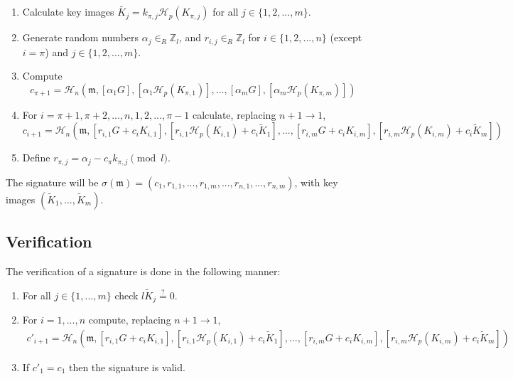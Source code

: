 \begin{enumerate}
	
	\item Calculate key images \(\tilde{K_j} = k_{\pi, j} \mathcal{H}_p(K_{\pi, j})\) for all \(j \in \{1, 2, ..., m\}\).
	
	\item Generate random numbers  \(\alpha_j \in_R \mathbb{Z}_l\), and \(r_{i, j} \in_R \mathbb{Z}_l\) for \(i \in \{1, 2, ..., n\}\) (except \(i = \pi\)) and \(j \in \{1, 2, ..., m\}\).
	
	\item Compute 
	\[
	c_{\pi+1} = \mathcal{H}_n(\mathfrak{m}, [\alpha_1 G], [\alpha_1 \mathcal{H}_p(K_{\pi, 1})], ..., [\alpha_m G], [\alpha_m \mathcal{H}_p(K_{\pi, m})])
	\]
	
	\item For \(i = \pi+1, \pi+2, ..., n, 1, 2, ..., \pi-1\) calculate, replacing \(n + 1 \rightarrow 1\),\vspace{.2cm}
	\[  c_{i+1} = \mathcal{H}_n(\mathfrak{m}, [r_{i, 1} G + c_i K_{i, 1}], [r_{i, 1} \mathcal{H}_p(K_{i, 1}) + c_i \tilde{K}_1], 
	..., [r_{i, m} G + c_i K_{i, m}], [r_{i, m} \mathcal{H}_p(K_{i, m}) + c_i \tilde{K}_m])  \] 
	
	
	\item Define \(r_{\pi, j} = \alpha_j - c_\pi k_{\pi, j} \pmod l\).
	
\end{enumerate}

The signature will be \(\sigma(\mathfrak{m}) = (c_1, r_{1, 1}, ..., r_{1, m}, ..., r_{n, 1}, ..., r_{n, m}) \), with key images $(\tilde{K}_1, ...,  \tilde{K}_m)$.


\subsection*{Verification}

The verification of a signature is done in the following manner:

\begin{enumerate}
    \item For all $j \in \{1,...,m\}$ check $l \tilde{K}_j \stackrel{?}{=} 0$.
	\item  For \(i = 1, ..., n\) compute, replacing \(n + 1 \rightarrow 1\),\vspace{.2cm}
	\begin{align*}
	c'_{i+1} = \mathcal{H}_n(\mathfrak{m}, [r_{i, 1} G + c_i K_{i, 1}], [r_{i, 1} \mathcal{H}_p(K_{i, 1}) + c_i \tilde{K}_1], 
	..., [r_{i, m} G + c_i K_{i, m}], [r_{i, m} \mathcal{H}_p(K_{i, m}) + c_i \tilde{K}_m]) 
	\end{align*}
	
	\item If \(c'_1 = c_1\) then the signature is valid.
\end{enumerate}


